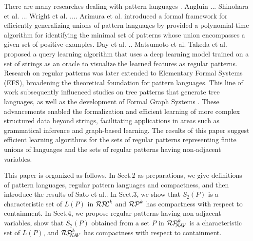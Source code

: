 %
%

There are many researches dealing with pattern languages \cite{Angluin1980b,Wright1989,Sato1,Shinohara2000,Day2017,Matsumoto2020,Taketa2022}.
Angluin \cite{Angluin1980b} ...
Shinohara et al. \cite{Shinohara2000}...
Wright et al. \cite{Wright1989}....
Arimura et al. \cite{Arimura1994} introduced a formal framework for efficiently generalizing unions of pattern languages by provided a polynomial-time algorithm for identifying the minimal set of patterns whose union encompasses a given set of positive examples.
Day et al. \cite{Day2017} ..
Matsumoto et al. \cite{Matsumoto2020}
Takeda et al. \cite{Taketa2022} proposed a query learning algorithm that uses a deep learning model trained on a set of strings as an oracle to visualize the learned features as regular patterns.
%
Research on regular patterns was later extended to Elementary Formal Systems (EFS)\cite{Arikawa1992}, broadening the theoretical foundation for pattern languages. This line of work subsequently influenced studies on tree patterns \cite{Arimura1997,Suzuki2006} that generate tree languages, as well as the development of Formal Graph Systems \cite{Uchida1994}. These advancements enabled the formalization and efficient learning of more complex structured data beyond strings, facilitating applications in areas such as grammatical inference and graph-based learning.
%
The results of this paper suggest efficient learning algorithms for the sets of regular patterns representing finite unions of languages and the sets of regular patterns having non-adjacent variables.

This paper is organized as follows.
In Sect.2 as preparations, we give definitions of pattern languages, regular pattern languages and compactness, and then introduce the results of Sato et al.\cite{Sato1}.
In Sect.3, we show that $S_{2}(P)$ is a characteristic set of $L(P)$ in $\mathcal{RP\!\!L}^{k}$ and $\mathcal{RP}^{k}$ has compactness with respect to containment.
In Sect.4, we propose regular patterns having non-adjacent variables, show that $S_2(P)$ obtained from a set $P$ in $\mathcal{RP}^{k}_{\!\!\!N\!A\!V}$ is a characteristic set of $L(P)$, and $\mathcal{RP}^{k}_{\!\!\!N\!A\!V}$ has compactness with respect to containment.

